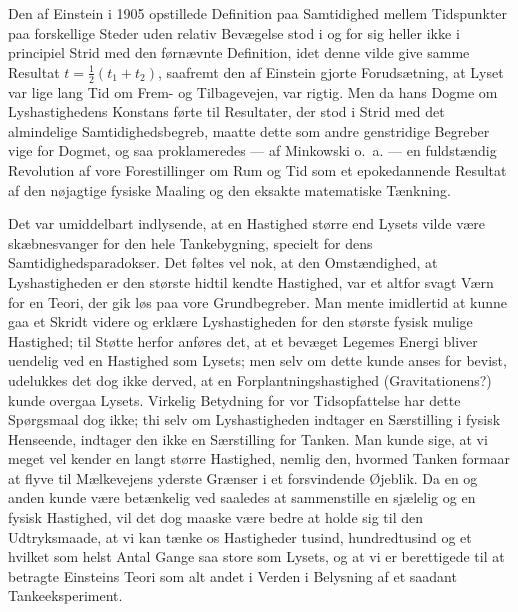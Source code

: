 \documentclass[12pt,a4paper]{article}
\newcommand{\opage}[1]{\marginnote{\footnotesize\textit{[#1]}}}
\begin{document}
Den af Einstein i 1905 opstillede Definition paa Samtidighed mellem Tidspunkter
paa forskellige Steder uden relativ Bevægelse stod i og for sig heller ikke i
principiel Strid med den førnævnte Definition, idet denne vilde give samme
Resultat $t = \tfrac{1}{2}(t_{1} + t_{2})$, saafremt den af Einstein gjorte
Forudsætning, at Lyset var lige lang Tid om Frem- og Tilbagevejen, var rigtig.
Men da hans Dogme om Lyshastighedens Konstans førte til Resultater, der stod i
Strid med det almindelige Samtidighedsbegreb, maatte dette som andre
genstridige Begreber vige for Dogmet, og saa proklameredes --- af Minkowski
o.~a. --- \guillemotleft en fuldstændig Revolution af vore Forestillinger om
Rum og Tid\guillemotright{} som et epokedannende Resultat af den nøjagtige
fysiske Maaling og den eksakte matematiske Tænkning.

Det var umiddelbart indlysende, at en Hastighed større end Lysets vilde være
skæbnesvanger for den hele Tankebygning, specielt for dens
Samtidighedsparadokser. Det føltes vel nok, at den Omstændighed, at
Lyshastigheden er den største hidtil kendte Hastighed, var et altfor svagt Værn
for en Teori, der gik løs paa vore Grundbegreber. Man mente imidlertid at kunne
gaa et Skridt videre og erklære Lyshastigheden for den største fysisk mulige
Hastighed; til Støtte herfor anføres det, at et bevæget Legemes Energi bliver
uendelig ved en Hastighed som Lysets; men selv om dette kunde anses for bevist,
udelukkes det dog ikke derved, at en Forplantningshastighed (Gravitationens?)
kunde overgaa Lysets. Virkelig Betydning for vor Tidsopfattelse har dette
Spørgsmaal dog ikke; thi selv om Lyshastigheden indtager en Særstilling i
fysisk Henseende, indtager den ikke en Særstilling for Tanken. Man kunde sige,
at vi meget vel kender en langt større Hastighed, nemlig den, hvormed
\opage{5} Tanken formaar at flyve til Mælkevejens yderste Grænser i et forsvindende
Øjeblik. Da en og anden kunde være betænkelig ved saaledes at sammenstille en
sjælelig og en fysisk Hastighed, vil det dog maaske være bedre at holde sig til
den Udtryksmaade, at vi kan tænke os Hastigheder tusind, hundredtusind og et
hvilket som helst Antal Gange saa store som Lysets, og at vi er berettigede til
at betragte Einsteins Teori som alt andet i Verden i Belysning af et saadant
Tankeeksperiment.
\end{document}
